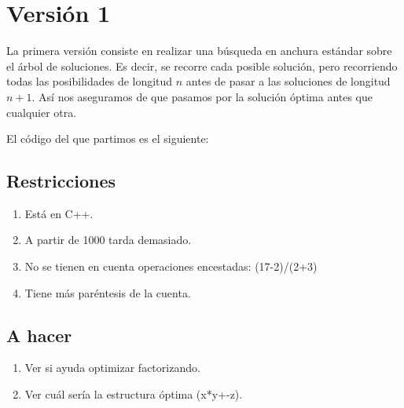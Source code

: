 \documentclass{article}
\title{}
\author{}
\date{}
\begin{document}
	
%	
%	
	
	\section{Versión 1}
	La primera versión consiste en realizar una búsqueda en anchura estándar sobre el árbol de soluciones. Es decir, se recorre cada posible solución, pero recorriendo todas las posibilidades de longitud $n$ antes de pasar a las soluciones de longitud $n+1$. Así nos aseguramos de que pasamos por la solución óptima antes que cualquier otra.
	
	El código del que partimos es el siguiente:
	
	
	
	\subsection{Restricciones}
	\begin{enumerate}
		\item Está en C++.
		\item A partir de 1000 tarda demasiado.
		\item No se tienen en cuenta operaciones encestadas: (17-2)/(2+3)
		\item Tiene más paréntesis de la cuenta.
	\end{enumerate}

	\subsection{A hacer}
	\begin{enumerate}
		\item Ver si ayuda optimizar factorizando.
		\item Ver cuál sería la estructura óptima (x*y+-z).
	\end{enumerate}
\end{document}
